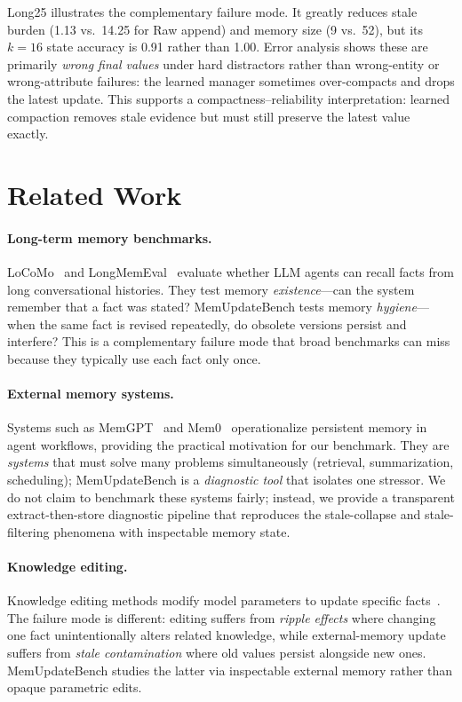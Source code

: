 \documentclass[11pt,twocolumn]{article}
\begin{document}
Long25 illustrates the complementary failure mode.
It greatly reduces stale burden (1.13 vs.\ 14.25 for Raw append) and memory size (9 vs.\ 52), but its \(k{=}16\) state accuracy is 0.91 rather than 1.00.
Error analysis shows these are primarily \emph{wrong final values} under hard distractors rather than wrong-entity or wrong-attribute failures: the learned manager sometimes over-compacts and drops the latest update.
This supports a compactness--reliability interpretation: learned compaction removes stale evidence but must still preserve the latest value exactly.

\section{Related Work}

\paragraph{Long-term memory benchmarks.}
LoCoMo~\citep{locomo} and LongMemEval~\citep{longmemeval} evaluate whether LLM agents can recall facts from long conversational histories.
They test memory \emph{existence}---can the system remember that a fact was stated?
MemUpdateBench tests memory \emph{hygiene}---when the same fact is revised repeatedly, do obsolete versions persist and interfere?
This is a complementary failure mode that broad benchmarks can miss because they typically use each fact only once.

\paragraph{External memory systems.}
Systems such as MemGPT~\citep{memgpt} and Mem0~\citep{mem0} operationalize persistent memory in agent workflows, providing the practical motivation for our benchmark.
They are \emph{systems} that must solve many problems simultaneously (retrieval, summarization, scheduling); MemUpdateBench is a \emph{diagnostic tool} that isolates one stressor.
We do not claim to benchmark these systems fairly; instead, we provide a transparent extract-then-store diagnostic pipeline that reproduces the stale-collapse and stale-filtering phenomena with inspectable memory state.

\paragraph{Knowledge editing.}
Knowledge editing methods modify model parameters to update specific facts~\citep{knowledge_editing_survey, mquake}.
The failure mode is different: editing suffers from \emph{ripple effects} where changing one fact unintentionally alters related knowledge, while external-memory update suffers from \emph{stale contamination} where old values persist alongside new ones.
MemUpdateBench studies the latter via inspectable external memory rather than opaque parametric edits.
\end{document}
